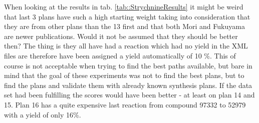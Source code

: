\documentclass[a4paper,10pt,titlepage]{paper}
\begin{document}
When looking at the results in tab. \ref{tab::StrychnineResults} it might be weird that last 3 plans have such a high starting weight taking into consideration that they are from other plans than the 13 first and that both Mori and Fukuyama are newer publications. Would it not be assumed that they should be better then? The thing is they all have had a reaction which had no yield in the XML files are therefore have been assigned a yield automatically of 10 \%. This of course is not acceptable when trying to find the best paths available, but bare in mind that the goal of these experiments was not to find the best plans, but to find the plans and validate them with already known synthesis plans. If the data set had been fulfilling the scores would have been better - at least on plan 14 and 15. Plan 16 has a quite expensive last reaction from compound 97332 to 52979 with a yield of only 16\%.
\end{document}
